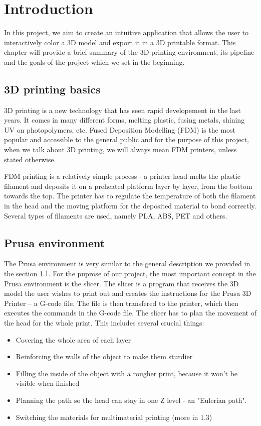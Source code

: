 \chapter{Introduction}

In this project, we aim to create an intuitive application that allows the user to interactively color a 3D model and export it in a 3D printable format. This chapter will provide a brief summary of the 3D printing environment, its pipeline and the goals of the project which we set in the beginning.

\section{3D printing basics}

3D printing is a new technology that has seen rapid developement in the last years. It comes in many different forms, melting plastic, fusing metals, shining UV on photopolymers, etc. Fused Deposition Modelling (FDM) is the most popular and accessible to the general public and for the purpose of this project, when we talk about 3D printing, we will always mean FDM printers, unless stated otherwise.

FDM printing is a relatively simple process - a printer head melts the plastic filament and deposits it on a preheated platform layer by layer, from the bottom towards the top. The printer has to regulate the temperature of both the filament in the head and the moving platform for the deposited material to bond correctly. Several types of filaments are used, namely PLA, ABS, PET and others.

\section{Prusa environment}

The Prusa environment is very similar to the general description we provided in the section 1.1. For the puprose of our project, the most important concept in the Prusa environment is the slicer. The slicer is a program that receives the 3D model the user wishes to print out and creates the instructions for the Prusa 3D Printer -- a G-code file. The file is then transfered to the printer, which then executes the commands in the G-code file. The slicer has to plan the movement of the head for the whole print. This includes several crucial things:

\begin{itemize}
\item Covering the whole area of each layer
\item Reinforcing the walls of the object to make them sturdier
\item Filling the inside of the object with a rougher print, because it won't be visible when finished
\item Planning the path so the head can stay in one Z level - an "Eulerian path".
\item Switching the materials for multimaterial printing (more in 1.3)
\end{itemize}


